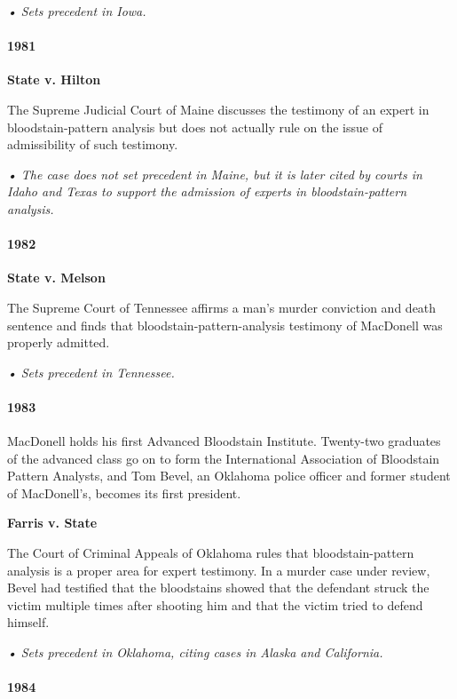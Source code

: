 \emph{• Sets precedent in Iowa.}

\hypertarget{1981}{%
\paragraph{1981}\label{1981}}

\textbf{State v. Hilton}

The Supreme Judicial Court of Maine discusses the testimony of an expert
in bloodstain-pattern analysis but does not actually rule on the issue
of admissibility of such testimony.

\emph{• The case does not set precedent in Maine, but it is later cited
by courts in Idaho and Texas to support the admission of experts in
bloodstain-pattern analysis.}

\hypertarget{1982}{%
\paragraph{1982}\label{1982}}

\textbf{State v. Melson}

The Supreme Court of Tennessee affirms a man's murder conviction and
death sentence and finds that bloodstain-pattern-analysis testimony of
MacDonell was properly admitted.

\emph{• Sets precedent in Tennessee.}

\hypertarget{1983}{%
\paragraph{1983}\label{1983}}

MacDonell holds his first Advanced Bloodstain Institute. Twenty-two
graduates of the advanced class go on to form the International
Association of Bloodstain Pattern Analysts, and Tom Bevel, an Oklahoma
police officer and former student of MacDonell's, becomes its first
president.

\textbf{Farris v. State}

The Court of Criminal Appeals of Oklahoma rules that bloodstain-pattern
analysis is a proper area for expert testimony. In a murder case under
review, Bevel had testified that the bloodstains showed that the
defendant struck the victim multiple times after shooting him and that
the victim tried to defend himself.

\emph{• Sets precedent in Oklahoma, citing cases in Alaska and
California.}

\hypertarget{1984}{%
\paragraph{1984}\label{1984}}

